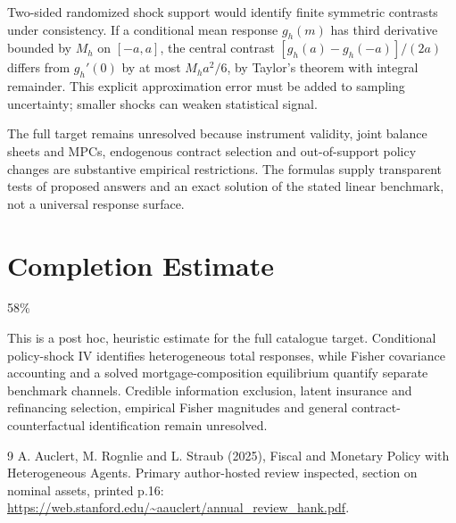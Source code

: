 \documentclass[11pt]{article}
\begin{document}
Two-sided randomized shock support would identify finite symmetric contrasts under consistency. If a conditional mean response $g_h(m)$ has third derivative bounded by $M_h$ on $[-a,a]$, the central contrast $[g_h(a)-g_h(-a)]/(2a)$ differs from $g_h'(0)$ by at most $M_ha^2/6$, by Taylor's theorem with integral remainder. This explicit approximation error must be added to sampling uncertainty; smaller shocks can weaken statistical signal.

The full target remains unresolved because instrument validity, joint balance sheets and MPCs, endogenous contract selection and out-of-support policy changes are substantive empirical restrictions. The formulas supply transparent tests of proposed answers and an exact solution of the stated linear benchmark, not a universal response surface.

\section{Completion Estimate}
58\%

This is a post hoc, heuristic estimate for the full catalogue target.
Conditional policy-shock IV identifies heterogeneous total responses, while Fisher covariance accounting and a solved mortgage-composition equilibrium quantify separate benchmark channels. Credible information exclusion, latent insurance and refinancing selection, empirical Fisher magnitudes and general contract-counterfactual identification remain unresolved.

\begin{thebibliography}{9}
 A. Auclert, M. Rognlie and L. Straub (2025), Fiscal and Monetary Policy with Heterogeneous Agents. Primary author-hosted review inspected, section on nominal assets, printed p.16: \url{https://web.stanford.edu/~aauclert/annual_review_hank.pdf}.
\end{thebibliography}
\end{document}
